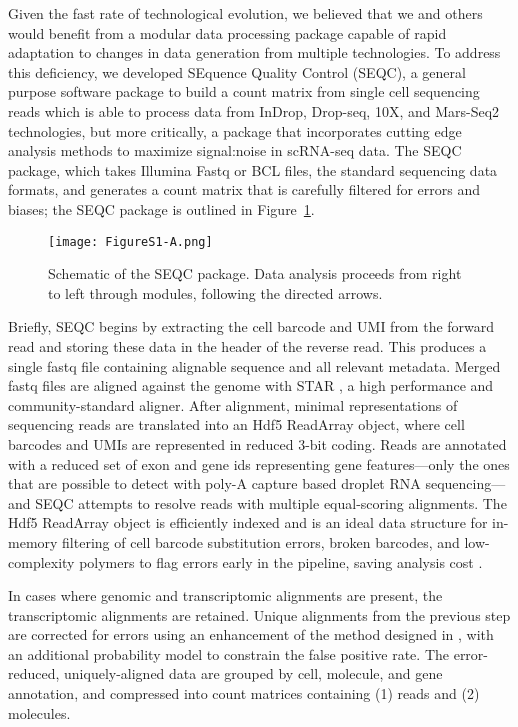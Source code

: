 Given the fast rate of technological evolution, we believed that we and others would benefit from a modular data processing package capable of rapid adaptation to changes in data generation from multiple technologies.
To address this deficiency, we developed SEquence Quality Control (SEQC), a general purpose software package to build a count matrix from single cell sequencing reads which is able to process data from InDrop, Drop-seq, 10X, and Mars-Seq2 technologies, but more critically, a package that incorporates cutting edge analysis methods to maximize signal:noise in scRNA-seq data. 
The SEQC package, which takes Illumina Fastq or BCL files, the standard sequencing data formats, and generates a count matrix that is carefully filtered for errors and biases; the SEQC package is outlined in Figure~\ref{fig:s1a}. 

\begin{figure}
\centering
\texttt{[image: FigureS1-A.png]}
\caption{Schematic of the SEQC package. Data analysis proceeds from right to left through modules, following the directed arrows.}
\label{fig:s1a}
\end{figure} 

Briefly, SEQC begins by extracting the cell barcode and UMI from the forward read and storing these data in the header of the reverse read.
This produces a single fastq file containing alignable sequence and all relevant metadata.
Merged fastq files are aligned against the genome with STAR \citep{Dobin2013}, a high performance and community-standard aligner. 
After alignment, minimal representations of sequencing reads are translated into an Hdf5 {\mono ReadArray} object, where cell barcodes and UMIs are represented in reduced 3-bit coding. 
Reads are annotated with a reduced set of exon and gene ids representing gene features---only the ones that are possible to detect with poly-A capture based droplet RNA sequencing---and SEQC attempts to resolve reads with multiple equal-scoring alignments.
The Hdf5 {\mono ReadArray} object is efficiently indexed and is an ideal data structure for in-memory filtering of cell barcode substitution errors, broken barcodes, and low-complexity polymers to flag errors early in the pipeline, saving analysis cost \citep{Alted2002}.

In cases where genomic and transcriptomic alignments are present, the transcriptomic alignments are retained. 
Unique alignments from the previous step are corrected for errors using an enhancement of the method designed in \cite{Jaitin2014}, with an additional probability model to constrain the false positive rate.
The error-reduced, uniquely-aligned data are grouped by cell, molecule, and gene annotation, and compressed into count matrices containing (1) reads and (2) molecules. 

